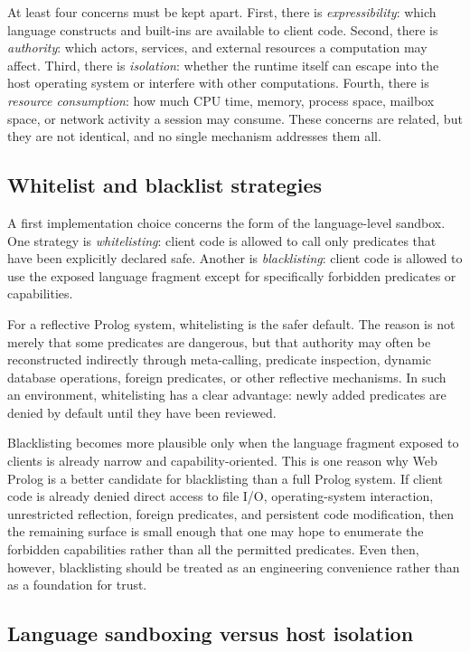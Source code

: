 At least four concerns must be kept apart. First, there is \emph{expressibility}: which language constructs and built-ins are available to client code. Second, there is \emph{authority}: which actors, services, and external resources a computation may affect. Third, there is \emph{isolation}: whether the runtime itself can escape into the host operating system or interfere with other computations. Fourth, there is \emph{resource consumption}: how much CPU time, memory, process space, mailbox space, or network activity a session may consume. These concerns are related, but they are not identical, and no single mechanism addresses them all.

\subsection{Whitelist and blacklist strategies}

A first implementation choice concerns the form of the language-level sandbox. One strategy is \emph{whitelisting}: client code is allowed to call only predicates that have been explicitly declared safe. Another is \emph{blacklisting}: client code is allowed to use the exposed language fragment except for specifically forbidden predicates or capabilities.

For a reflective Prolog system, whitelisting is the safer default. The reason is not merely that some predicates are dangerous, but that authority may often be reconstructed indirectly through meta-calling, predicate inspection, dynamic database operations, foreign predicates, or other reflective mechanisms. In such an environment, whitelisting has a clear advantage: newly added predicates are denied by default until they have been reviewed.

Blacklisting becomes more plausible only when the language fragment exposed to clients is already narrow and capability-oriented. This is one reason why Web Prolog is a better candidate for blacklisting than a full Prolog system. If client code is already denied direct access to file I/O, operating-system interaction, unrestricted reflection, foreign predicates, and persistent code modification, then the remaining surface is small enough that one may hope to enumerate the forbidden capabilities rather than all the permitted predicates. Even then, however, blacklisting should be treated as an engineering convenience rather than as a foundation for trust.

\subsection{Language sandboxing versus host isolation}

